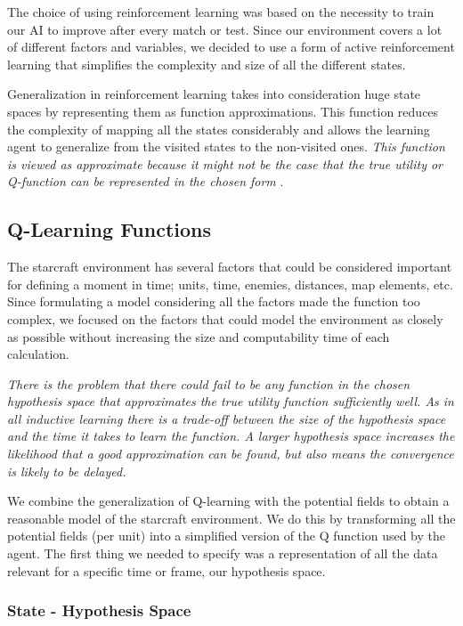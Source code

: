 The choice of using reinforcement learning was based on the necessity to train our AI to improve after every match or test. Since our environment covers a lot of different factors and variables, we decided to use a form of active reinforcement learning that simplifies the complexity and size of all the different states. 

Generalization in reinforcement learning takes into consideration huge state spaces by representing them as function approximations. This function reduces the complexity of mapping all the states considerably and allows the learning agent to generalize from the visited states to the non-visited ones. \textit{This function is viewed as approximate because it might not be the case that the true utility or Q-function can be represented in the chosen form} \cite[p777]{rl}. 

\subsection{Q-Learning Functions}

The starcraft environment has several factors that could be considered important for defining a moment in time; units, time, enemies, distances, map elements, etc. Since formulating a model considering all the factors made the function too complex, we focused on the factors that could model the environment as closely as possible without increasing the size and computability time of each calculation. 

\textit{There is the problem that there could fail to be any function in the chosen hypothesis space that approximates the true utility function sufficiently well. As in all inductive learning there is a trade-off between the size of the hypothesis space and the time it takes to learn the function. A larger hypothesis space increases the likelihood that a good approximation can be found, but also means the convergence is likely to be delayed.}\cite[p778]{rl}

We combine the generalization of Q-learning with the potential fields to obtain a reasonable model of the starcraft environment. We do this by transforming all the potential fields (per unit) into a simplified version of the Q function used by the agent. The first thing we needed to specify was a representation of all the data relevant for a specific time or frame, our hypothesis space. 

\subsubsection{State - Hypothesis Space}

